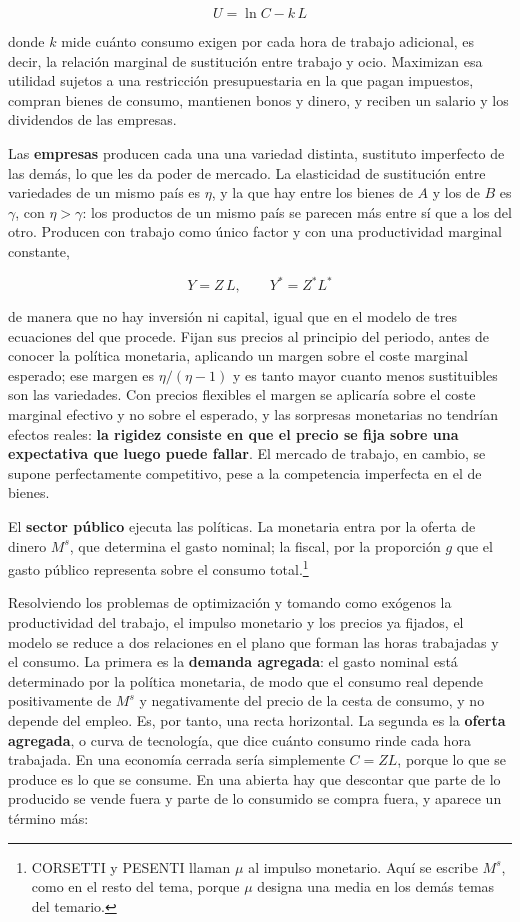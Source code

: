 \documentclass[10pt,a4paper]{article}
\begin{document}
$$U=\ln C-k\,L$$

donde $k$ mide cuánto consumo exigen por cada hora de trabajo adicional, es decir, la relación marginal de sustitución entre trabajo y ocio. Maximizan esa utilidad sujetos a una restricción presupuestaria en la que pagan impuestos, compran bienes de consumo, mantienen bonos y dinero, y reciben un salario y los dividendos de las empresas.

Las \textbf{empresas} producen cada una una variedad distinta, sustituto imperfecto de las demás, lo que les da poder de mercado. La elasticidad de sustitución entre variedades de un mismo país es $\eta$, y la que hay entre los bienes de $A$ y los de $B$ es $\gamma$, con $\eta>\gamma$: los productos de un mismo país se parecen más entre sí que a los del otro. Producen con trabajo como único factor y con una productividad marginal constante,

$$Y=Z\,L,\qquad Y^{*}=Z^{*}L^{*}$$

de manera que no hay inversión ni capital, igual que en el modelo de tres ecuaciones del que procede. Fijan sus precios al principio del periodo, antes de conocer la política monetaria, aplicando un margen sobre el coste marginal esperado; ese margen es $\eta/(\eta-1)$ y es tanto mayor cuanto menos sustituibles son las variedades. Con precios flexibles el margen se aplicaría sobre el coste marginal efectivo y no sobre el esperado, y las sorpresas monetarias no tendrían efectos reales: \textbf{la rigidez consiste en que el precio se fija sobre una expectativa que luego puede fallar}. El mercado de trabajo, en cambio, se supone perfectamente competitivo, pese a la competencia imperfecta en el de bienes.

El \textbf{sector público} ejecuta las políticas. La monetaria entra por la oferta de dinero $M^{s}$, que determina el gasto nominal; la fiscal, por la proporción $g$ que el gasto público representa sobre el consumo total.\footnote{%
    CORSETTI y PESENTI llaman $\mu$ al impulso monetario. Aquí se escribe $M^{s}$, como en el resto del tema, porque $\mu$ designa una media en los demás temas del temario.
}

Resolviendo los problemas de optimización y tomando como exógenos la productividad del trabajo, el impulso monetario y los precios ya fijados, el modelo se reduce a dos relaciones en el plano que forman las horas trabajadas y el consumo. La primera es la \textbf{demanda agregada}: el gasto nominal está determinado por la política monetaria, de modo que el consumo real depende positivamente de $M^{s}$ y negativamente del precio de la cesta de consumo, y no depende del empleo. Es, por tanto, una recta horizontal. La segunda es la \textbf{oferta agregada}, o curva de tecnología, que dice cuánto consumo rinde cada hora trabajada. En una economía cerrada sería simplemente $C=ZL$, porque lo que se produce es lo que se consume. En una abierta hay que descontar que parte de lo producido se vende fuera y parte de lo consumido se compra fuera, y aparece un término más:
\end{document}
